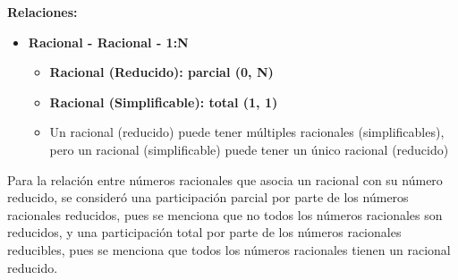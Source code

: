 \textbf{Relaciones:}
\begin{itemize}
  \item \textbf{Racional - Racional - 1:N}
  \begin{itemize}
    \item \textbf{Racional (Reducido): parcial (0, N)}
    \item \textbf{Racional (Simplificable): total (1, 1)}
      
    \item Un racional (reducido) puede tener múltiples racionales (simplificables), pero un racional (simplificable) puede tener un único racional (reducido)
  \end{itemize}
\end{itemize}

Para la relación entre números racionales que asocia un racional con su número reducido, se consideró una participación parcial por parte de los números racionales reducidos, pues se menciona que no todos los números racionales son reducidos, y una participación total por parte de los números racionales reducibles, pues se menciona que todos los números racionales tienen un racional reducido.


